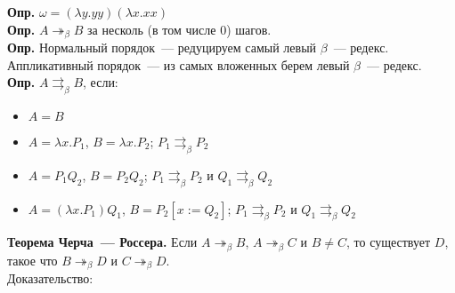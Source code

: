 \documentclass[12pt]{article}
\begin{document}
	\textbf{Опр.} $\omega = (\lambda y. yy)(\lambda x. xx)$ \\
	\textbf{Опр.} $A \twoheadrightarrow_{\beta} B$ за несколь (в том числе $0$) шагов. \\
	\textbf{Опр.} Нормальный порядок~--- редуцируем самый левый $\beta$~--- редекс. Аппликативный порядок~--- из самых вложенных берем левый $\beta$~--- редекс. \\
	\textbf{Опр.} $A \rightrightarrows_{\beta} B$, если:
	\begin{itemize}
		\item $A = B$
		\item $A = \lambda x. P_1$, $B = \lambda x. P_2$; $P_1 \rightrightarrows_{\beta} P_2$
		\item $A = P_1Q_2$, $B = P_2Q_2$; $P_1 \rightrightarrows_{\beta} P_2$ и $Q_1 \rightrightarrows_{\beta} Q_2$
		\item $A = (\lambda x. P_1)Q_1$, $B = P_2[x := Q_2]$; $P_1 \rightrightarrows_{\beta} P_2$ и $Q_1 \rightrightarrows_{\beta} Q_2$
	\end{itemize}
	\textbf{Теорема Черча~--- Россера.} Если $A \twoheadrightarrow_{\beta} B$, $A \twoheadrightarrow_{\beta} C$ и $B \not= C$, то существует $D$, такое что $B \twoheadrightarrow_{\beta} D$ и $C \twoheadrightarrow_{\beta} D$. \\
	Доказательство:
\end{document}
